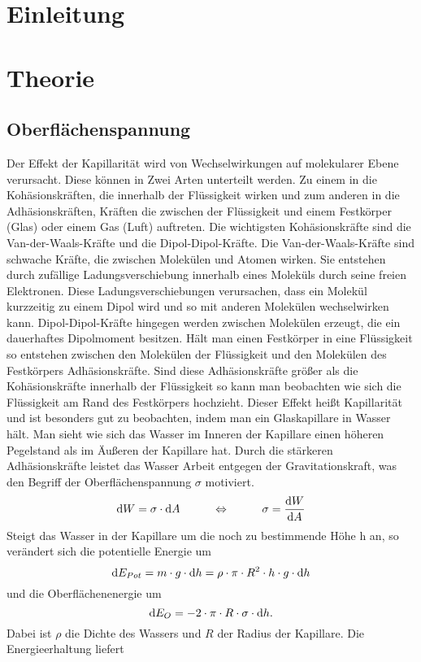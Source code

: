 \documentclass[12pt, a4paper, twoside]{scrartcl}
\begin{document}

\cleardoublepage
\tableofcontents
\cleardoublepage
\setcounter{page}{1}

\section{Einleitung}
\label{sec:einleitung}

\section{Theorie}
\label{sec:theorie}

\subsection{Oberflächenspannung}
Der Effekt der Kapillarität wird von Wechselwirkungen auf molekularer Ebene verursacht. Diese können in Zwei Arten unterteilt werden. Zu einem in die Kohäsionskräften, die innerhalb der Flüssigkeit wirken und zum anderen in die Adhäsionskräften, Kräften die zwischen der Flüssigkeit und einem Festkörper (Glas) oder einem Gas (Luft) auftreten.\newline
\newline
Die wichtigsten Kohäsionskräfte sind die Van-der-Waals-Kräfte und die Dipol-Dipol-Kräfte. Die Van-der-Waals-Kräfte sind schwache Kräfte, die zwischen Molekülen und Atomen wirken. Sie entstehen durch zufällige Ladungsverschiebung innerhalb eines Moleküls durch seine freien Elektronen. Diese Ladungsverschiebungen verursachen, dass ein Molekül kurzzeitig zu einem Dipol wird und so mit anderen Molekülen wechselwirken kann. 
Dipol-Dipol-Kräfte hingegen werden zwischen Molekülen erzeugt, die ein dauerhaftes Dipolmoment besitzen.\newline
\newline
Hält man einen Festkörper in eine Flüssigkeit so entstehen zwischen den Molekülen der Flüssigkeit und den Molekülen des Festkörpers Adhäsionskräfte. Sind diese Adhäsionskräfte größer als die Kohäsionskräfte innerhalb der Flüssigkeit so kann man beobachten wie sich die Flüssigkeit am Rand des Festkörpers hochzieht. Dieser Effekt heißt Kapillarität und ist besonders gut zu beobachten, indem man ein Glaskapillare in Wasser hält. Man sieht wie sich das Wasser im Inneren der Kapillare einen höheren Pegelstand als im Äußeren der Kapillare hat. Durch die stärkeren Adhäsionskräfte leistet das Wasser Arbeit entgegen der Gravitationskraft, was den Begriff der Oberflächenspannung $\sigma$ motiviert. \[\textup dW=\sigma\cdot\textup dA\hspace{1cm}\Leftrightarrow\hspace{1cm}\sigma=\frac{\textup dW}{\textup dA}\] Steigt das Wasser in der Kapillare um die noch zu bestimmende Höhe h an, so verändert sich die potentielle Energie um \[\textup dE_{Pot}=m\cdot g\cdot\textup dh=\rho\cdot\pi\cdot R^2\cdot h\cdot g\cdot\textup dh\] und die Oberflächenenergie um \[\textup dE_{O}=-2\cdot\pi\cdot R\cdot\sigma\cdot\textup dh.\]Dabei ist $\rho$ die Dichte des Wassers und $R$ der Radius der Kapillare. Die Energieerhaltung liefert 
\end{document}
